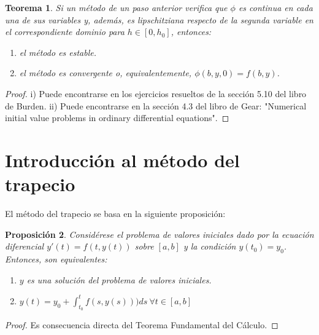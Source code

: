 \documentclass{article}
\theoremstyle{theorem-style}  %
\newtheorem{theorem}{Teorema}[section]  %
\newtheorem{proposition}[theorem]{Proposición}
\theoremstyle{definition-style}
\theoremstyle{example-style}
\begin{document}
	\begin{theorem}
		Si un método de un paso anterior verifica que $\phi$ es continua en cada una de sus variables y, además, es lipschitziana respecto de la segunda variable en el correspondiente dominio para $h \in [0, h_0]$, entonces:
		\begin{enumerate}
			\item el método es estable. 
			\item el método es convergente o, equivalentemente, $\phi(b,y,0) = f(b,y)$.
		\end{enumerate}		
	\end{theorem}
	
	\begin{proof}
		i) Puede encontrarse en los ejercicios resueltos de la sección 5.10 del libro de Burden. ii) Puede encontrarse en la sección 4.3 del libro de Gear: "Numerical initial value problems in ordinary differential equations".
	\end{proof}
	
	

\section{Introducción al método del trapecio} \label{sec:intro-trapecio}

	El método del trapecio se basa en la siguiente proposición:

	\begin{proposition} \label{prop:sol-eq}
		Considérese el problema de valores iniciales dado por la ecuación diferencial $y'(t) = f(t,y(t))$ sobre $[a,b]$ y la condición $y(t_0) = y_0$.  Entonces, son equivalentes:
		\begin{enumerate}
			\item $y$ es una solución del problema de valores iniciales.
			\item $y(t) = y_0 + \int_{t_0}^{t} f(s,y(s))) ds \ \forall t \in [a,b]$
		\end{enumerate}
	\end{proposition}
	
	\begin{proof}
		Es consecuencia directa del Teorema Fundamental del Cálculo.
	\end{proof}
\end{document}
